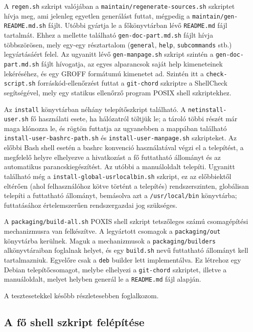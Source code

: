 \documentclass[
]{elteikthesis}[2025/03/25]
\begin{document}
A \verb|regen.sh| szkript valójában a \verb|maintain/regenerate-sources.sh| szkriptet hívja meg,
ami jelenleg egyetlen generálást futtat, mégpedig a \verb|maintain/gen-README.md.sh| fájlt.
Utóbbi gyártja le a főkönyvtárban lévő \verb|README.md| fájl tartalmát.
Ehhez a mellette található \verb|gen-doc-part.md.sh| fájlt hívja többszörösen,
mely egy-egy résztartalom (\verb|general|, \verb|help|, \verb|subcommands| stb.) legyártásáért felel.
Az ugyanitt lévő \verb|gen-manpage.sh| szkript szintén a \verb|gen-doc-part.md.sh| fájlt hívogatja,
az egyes alparancsok saját help kimeneteinek lekéréséhez,
és egy GROFF formátumú kimenetet ad.
Szintén itt a \verb|check-script.sh| forráskód-ellenőrzést futtat a \verb|git-chord| szkriptre
a ShellCheck segítségével, mely egy statikus ellenőrző program POSIX shell szkriptekhez.

Az \verb|install| könyvtárban néhány telepítőszkript található.
A \verb|netinstall-user.sh| fő használati esete, ha hálózatról töltjük le;
a tároló többi részét már maga klónozza le,
és rögtön futtatja az ugyanebben a mappában található
\verb|install-user-bashrc-path.sh| és
\verb|install-user-manpage.sh| szkripteket.
Az előbbi Bash shell esetén a bashrc konvenció használatával végzi el a telepítést,
a megfelelő helyre elhelyezve a hivatkozást a fő futtatható állományt és az automatikus parancskiegészítést.
Az utóbbi a manuáloldalt telepíti.
Ugyanitt található még a \verb|install-global-usrlocalbin.sh| szkript,
ez az előbbiektől eltérően (ahol felhasználóhoz kötve történt a telepítés)
rendszerszinten, globálisan telepíti a futtatható állományt,
bemásolva azt a \verb|/usr/local/bin| könyvtárba;
futtatásához értelemszerűen rendszergazdai jog szükséges.

A \verb|packaging/build-all.sh| POXIS shell szkript tetszőleges számú csomagépítési mechanizmusra van felkészítve.
A legyártott csomagok a \verb|packaging/out| könyvtárba kerülnek.
Maguk a mechanizmusok a \verb|packaging/builders| alkönyvtáraiban foglalnak helyet,
és egy \verb|build.sh| nevű futtatható állományt kell tartalmazniuk.
Egyelőre csak a \verb|deb| builder lett implementálva.
Ez létrehoz egy Debian telepítőcsomagot, melybe elhelyezi a \verb|git-chord| szkriptet,
illetve a manuáloldalt, melyet helyben generál le a \verb|README.md| fájl alapján.

A tesztesetekkel később részletesebben foglalkozom.

\subsection{A fő shell szkript felépítése}
\end{document}
